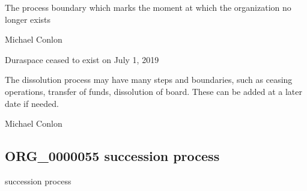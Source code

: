 \documentclass[letterpaper,10pt,english]{sphinxmanual}
\begin{document}
\begin{sphinxShadowBox}

\sphinxAtStartPar
{\hyperref[\detokenize{doc-BFO_0000035::doc}]{}}
\end{sphinxShadowBox}

\begin{sphinxShadowBox}

\sphinxAtStartPar
The process boundary which marks the moment at which the organization no longer exists
\end{sphinxShadowBox}

\begin{sphinxShadowBox}

\sphinxAtStartPar
Michael Conlon 
\end{sphinxShadowBox}

\begin{sphinxShadowBox}

\sphinxAtStartPar
Duraspace ceased to exist on July 1, 2019
\end{sphinxShadowBox}

\begin{sphinxShadowBox}

\sphinxAtStartPar
The dissolution process may have many steps and boundaries, such as ceasing operations, transfer of funds, dissolution of board.  These can be added at a later date if needed.
\end{sphinxShadowBox}

\begin{sphinxShadowBox}

\sphinxAtStartPar
Michael Conlon 
\end{sphinxShadowBox}
\begin{quote}

\ignorespaces \end{quote}


\subsection{ORG\_0000055 \sphinxhyphen{} succession process}
\label{\detokenize{doc-ORG_0000055:org-0000055-succession-process}}\label{\detokenize{doc-ORG_0000055:index-0}}\label{\detokenize{doc-ORG_0000055::doc}}
\begin{sphinxShadowBox}

\sphinxAtStartPar
succession process
\end{sphinxShadowBox}
\end{document}
